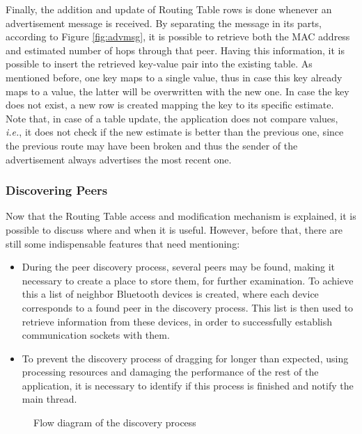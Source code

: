 Finally, the addition and update of Routing Table rows is done whenever an advertisement message is received. By separating the message in its parts, according to Figure \ref{fig:advmsg}, it is possible to retrieve both the \gls{MAC} address and estimated number of hops through that peer. Having this information, it is possible to insert the retrieved key-value pair into the existing table. As mentioned before, one key maps to a single value, thus in case this key already maps to a value, the latter will be overwritten with the new one. In case the key does not exist, a new row is created mapping the key to its specific estimate. Note that, in case of a table update, the application does not compare values, \textit{i.e.}, it does not check if the new estimate is better than the previous one, since the previous route may have been broken and thus the sender of the advertisement always advertises the most recent one.

\subsubsection{Discovering Peers}
\label{subsubsec:disc}

Now that the Routing Table access and modification mechanism is explained, it is possible to discuss where and when it is useful. However, before that, there are still some indispensable features that need mentioning:

\begin{itemize}
	\item During the peer discovery process, several peers may be found, making it necessary to create a place to store them, for further examination. To achieve this a list of neighbor Bluetooth devices is created, where each device corresponds to a found peer in the discovery process. This list is then used to retrieve information from these devices, in order to successfully establish communication sockets with them.
	
	\item To prevent the discovery process of dragging for longer than expected, using processing resources and damaging the performance of the rest of the application, it is necessary to identify if this process is finished and notify the main thread.
\end{itemize}

\begin{figure}[ht]
	\noindent{}
	\caption{\label{fig:discflux} Flow diagram of the discovery process}
\end{figure}

